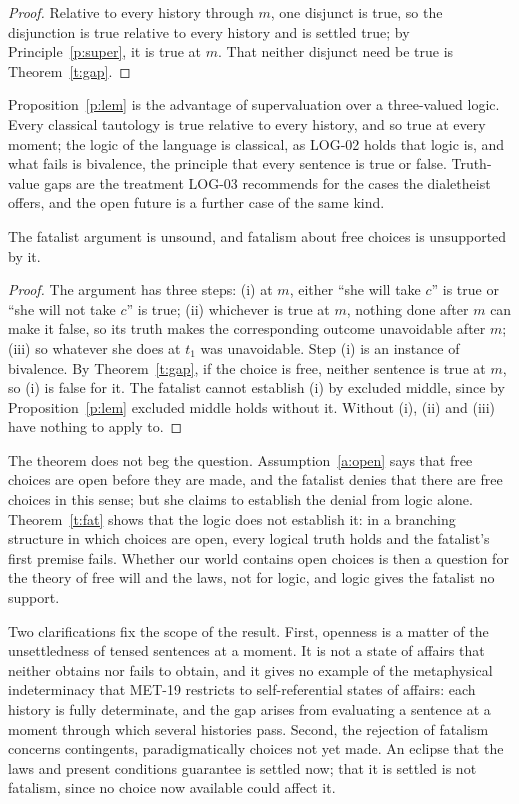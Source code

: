 \documentclass{situationist-preprint}
\begin{document}
\begin{proof}
Relative to every history through $m$, one disjunct is true, so the disjunction is true relative to every history and is settled true; by Principle~\ref{p:super}, it is true at $m$. That neither disjunct need be true is Theorem~\ref{t:gap}.
\end{proof}

Proposition~\ref{p:lem} is the advantage of supervaluation over a three-valued logic. Every classical tautology is true relative to every history, and so true at every moment; the logic of the language is classical, as LOG-02 holds that logic is, and what fails is bivalence, the principle that every sentence is true or false. Truth-value gaps are the treatment LOG-03 recommends for the cases the dialetheist offers, and the open future is a further case of the same kind.

\begin{theorem}\label{t:fat}
The fatalist argument is unsound, and fatalism about free choices is unsupported by it.
\end{theorem}

\begin{proof}
The argument has three steps: (i) at $m$, either \enquote{she will take $c$} is true or \enquote{she will not take $c$} is true; (ii) whichever is true at $m$, nothing done after $m$ can make it false, so its truth makes the corresponding outcome unavoidable after $m$; (iii) so whatever she does at $t_1$ was unavoidable. Step (i) is an instance of bivalence. By Theorem~\ref{t:gap}, if the choice is free, neither sentence is true at $m$, so (i) is false for it. The fatalist cannot establish (i) by excluded middle, since by Proposition~\ref{p:lem} excluded middle holds without it. Without (i), (ii) and (iii) have nothing to apply to.
\end{proof}

The theorem does not beg the question. Assumption~\ref{a:open} says that free choices are open before they are made, and the fatalist denies that there are free choices in this sense; but she claims to establish the denial from logic alone. Theorem~\ref{t:fat} shows that the logic does not establish it: in a branching structure in which choices are open, every logical truth holds and the fatalist's first premise fails. Whether our world contains open choices is then a question for the theory of free will and the laws, not for logic, and logic gives the fatalist no support.

Two clarifications fix the scope of the result. First, openness is a matter of the unsettledness of tensed sentences at a moment. It is not a state of affairs that neither obtains nor fails to obtain, and it gives no example of the metaphysical indeterminacy that MET-19 restricts to self-referential states of affairs: each history is fully determinate, and the gap arises from evaluating a sentence at a moment through which several histories pass. Second, the rejection of fatalism concerns contingents, paradigmatically choices not yet made. An eclipse that the laws and present conditions guarantee is settled now; that it is settled is not fatalism, since no choice now available could affect it.
\end{document}
